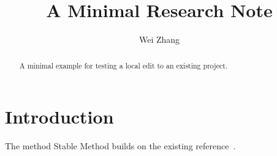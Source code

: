 \documentclass[journal]{IEEEtran}
\title{A Minimal Research Note}
\author{Wei Zhang}
\newcommand{\methodname}{Stable Method}
\begin{document}
\maketitle
\begin{abstract}
A minimal example for testing a local edit to an existing project.
\end{abstract}
\section{Introduction}
\label{sec:intro}
The method \methodname{} builds on the existing reference~\cite{knuth1984}.


\end{document}
